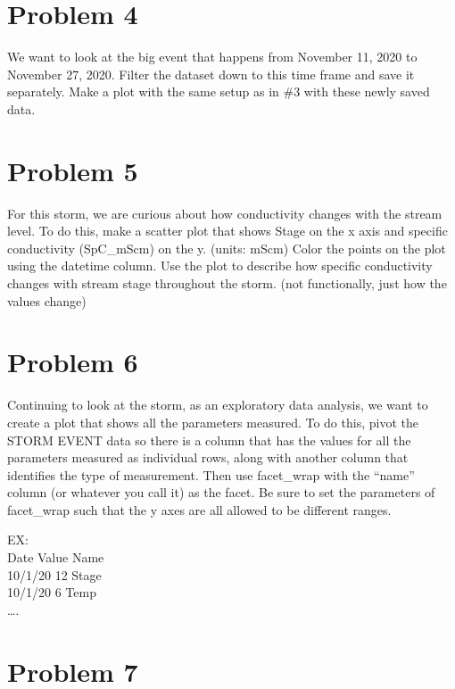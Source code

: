\documentclass[
]{book}
\begin{document}
\hypertarget{problem-4-3}{%
\section{Problem 4}\label{problem-4-3}}

We want to look at the big event that happens from November 11, 2020 to November 27, 2020. Filter the dataset down to this time frame and save it separately. Make a plot with the same setup as in \#3 with these newly saved data.

\hypertarget{problem-5-3}{%
\section{Problem 5}\label{problem-5-3}}

For this storm, we are curious about how conductivity changes with the stream level. To do this, make a scatter plot that shows Stage on the x axis and specific conductivity (SpC\_mScm) on the y. (units: mScm) Color the points on the plot using the datetime column. Use the plot to describe how specific conductivity changes with stream stage throughout the storm. (not functionally, just how the values change)

\hypertarget{problem-6-3}{%
\section{Problem 6}\label{problem-6-3}}

Continuing to look at the storm, as an exploratory data analysis, we want to create a plot that shows all the parameters measured. To do this, pivot the STORM EVENT data so there is a column that has the values for all the parameters measured as individual rows, along with another column that identifies the type of measurement. Then use facet\_wrap with the ``name'' column (or whatever you call it) as the facet. Be sure to set the parameters of facet\_wrap such that the y axes are all allowed to be different ranges.

EX:\\
Date Value Name\\
10/1/20 12 Stage\\
10/1/20 6 Temp\\
\ldots.

\hypertarget{problem-7-1}{%
\section{Problem 7}\label{problem-7-1}}
\end{document}
